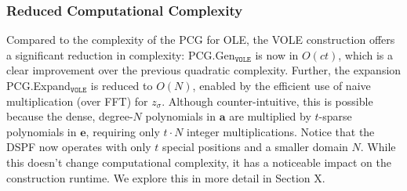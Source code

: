\subsubsection{Reduced Computational Complexity}
Compared to the complexity of the PCG for OLE, the VOLE construction offers a significant reduction in complexity: PCG.Gen$_{\texttt{VOLE}}$ is now in $O(ct)$, which is a clear improvement over the previous quadratic complexity. Further, the expansion PCG.Expand$_{\texttt{VOLE}}$ is reduced to $O(N)$, enabled by the efficient use of naive multiplication (over FFT) for $z_\sigma$. Although counter-intuitive, this is possible because the dense, degree-$N$ polynomials in $\boldsymbol{a}$ are multiplied by $t$-sparse polynomials in $\boldsymbol{e}$, requiring only $t \cdot N$ integer multiplications. Notice that the DSPF now operates with only $t$ special positions and a smaller domain $N$. While this doesn't change computational complexity, it has a noticeable impact on the construction runtime. We explore this in more detail in Section X.